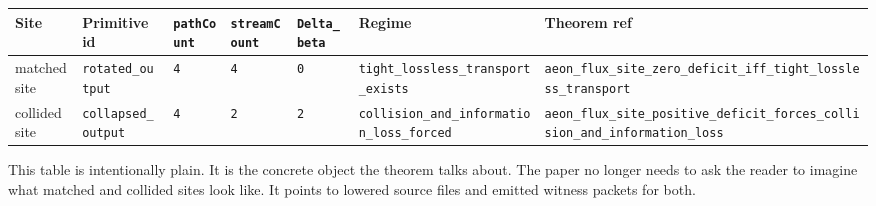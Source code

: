 \documentclass[
  11pt,
]{article}
\newcounter{none} %
\begin{document}
{\def\LTcaptype{none} %
\begin{longtable}[]{@{}
  >{\raggedright\arraybackslash}p{}
  >{\raggedright\arraybackslash}p{}
  >{\raggedleft\arraybackslash}p{}
  >{\raggedleft\arraybackslash}p{}
  >{\raggedleft\arraybackslash}p{}
  >{\raggedright\arraybackslash}p{}
  >{\raggedright\arraybackslash}p{}@{}}
\toprule\noalign{}
\begin{minipage}[b]{\linewidth}\raggedright
Site
\end{minipage} & \begin{minipage}[b]{\linewidth}\raggedright
Primitive id
\end{minipage} & \begin{minipage}[b]{\linewidth}\raggedleft
\texttt{pathCount}
\end{minipage} & \begin{minipage}[b]{\linewidth}\raggedleft
\texttt{streamCount}
\end{minipage} & \begin{minipage}[b]{\linewidth}\raggedleft
\texttt{Delta\_beta}
\end{minipage} & \begin{minipage}[b]{\linewidth}\raggedright
Regime
\end{minipage} & \begin{minipage}[b]{\linewidth}\raggedright
Theorem ref
\end{minipage} \\
\midrule\noalign{}
\endhead
\bottomrule\noalign{}
\endlastfoot
matched site & \texttt{rotated\_output} & \texttt{4} & \texttt{4} &
\texttt{0} & \texttt{tight\_lossless\_transport\_exists} &
\texttt{aeon\_flux\_site\_zero\_deficit\_iff\_tight\_lossless\_transport} \\
collided site & \texttt{collapsed\_output} & \texttt{4} & \texttt{2} &
\texttt{2} & \texttt{collision\_and\_information\_loss\_forced} &
\texttt{aeon\_flux\_site\_positive\_deficit\_forces\_collision\_and\_information\_loss} \\
\end{longtable}
}

This table is intentionally plain. It is the concrete object the theorem
talks about. The paper no longer needs to ask the reader to imagine what
matched and collided sites look like. It points to lowered source files
and emitted witness packets for both.
\end{document}
